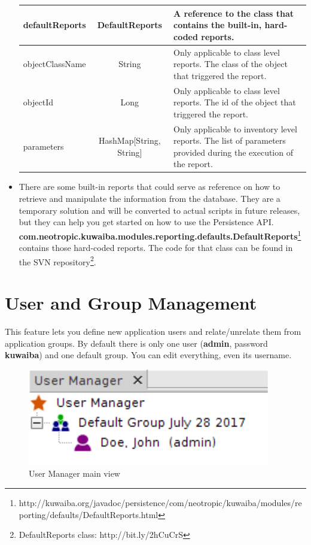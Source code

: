 \documentclass[a4paper]{article}
\begin{document}
\begin{itemize}
\begin{table}[h!]
\begin{tabular}{lcp{7cm}}
					\midrule
					defaultReports & DefaultReports & A reference to the class that contains the built-in, hard-coded reports. \\
					\midrule
					objectClassName & String & Only applicable to class level reports. The class of the object that triggered the report. \\
					\midrule
					objectId & Long & Only applicable to class level reports. The id of the object that triggered the report. \\
					\midrule
					parameters & HashMap[String, String] & Only applicable to inventory level reports. The list of parameters provided during the execution of the report.\\
				\end{tabular}
			\end{table}
			\item There are some built-in reports that could serve as reference on how to retrieve and manipulate the information from the database. They are a temporary solution and will be converted to actual scripts in future releases, but they can help you get started on how to use the Persistence API.\\
			\newline
			\textbf{com.neotropic.kuwaiba.modules.reporting.defaults.DefaultReports}\footnote{http://kuwaiba.org/javadoc/persistence/com/neotropic/kuwaiba/modules/reporting/defaults/DefaultReports.html} contains those hard-coded reports. The code for that class can be found in the SVN repository\footnote{DefaultReports class: http://bit.ly/2hCuCrS}.
		\end{itemize}
		
		\clearpage
		\section{User and Group Management} \label{sec:user_and_group_management}
		This feature lets you define new application users and relate/unrelate them from application groups. By default there is only one user (\textbf{admin}, password \textbf{kuwaiba}) and one default group.  You can edit everything, even its username.\\
		\begin{figure}[h!]
			\centering
			\includegraphics[width=0.3\linewidth]{img/user_manager_first_view.png}
			\caption{User Manager main view}
			\label{fig:user_manager_first_view}
		\end{figure}
		
\end{document}
